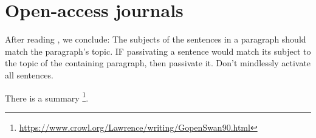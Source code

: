 




\section{Open-access journals}



After reading \cite{gopen1990science}, we conclude:
The subjects of the sentences in a paragraph should match the paragraph's topic.
IF passivating a sentence would match its subject to the topic of the containing paragraph, then passivate it.
Don't mindlessly activate all sentences.

There is a summary%
\footnote{\url{https://www.crowl.org/Lawrence/writing/GopenSwan90.html}}.
